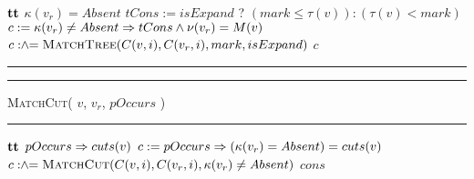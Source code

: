\begin{algorithm}[h!]
\begin{algorithmic}[1]
     \Return $\mathbf{tt}$ \EndIf
    \label{line:matchtree-vr-absent}
     \Return $\kappa(v_r) = Absent$ \EndIf
    \label{line:matchtree-v-absent}
    \State $tCons := isExpand$ \;? $( mark \leq \tau(v) ): ( \tau(v) < mark )$
    \State $c := \kappa(v_r) \neq Absent \Rightarrow tCons \land \nu(v_r)= M(v) $
    \label{line:matchtree-cons}
    \State\hspace{-2ex} $c \mathrel{:\hspace{-3pt}\land\hspace{-3pt}=} \textsc{MatchTree}( C(v,i), C(v_r,i), mark, isExpand)$
    \label{line:matchtree-recurse}
    \EndFor
    \State \Return $c$   
  \end{algorithmic}
  \hrule
  \vspace{3ex}
  \hrule\vspace{2pt}
  \textsc{MatchCut}( $v$, $v_r$, $pOccurs$ )\hfill\mbox{}
  \vspace{2pt}\hrule
  \begin{algorithmic}[1]
     \Return $\mathbf{tt}$ \EndIf
    \label{line:mcut-no-v}
     \Return $pOccurs \Rightarrow cuts(v)$ \EndIf
    \label{line:mcut-no-vr}
    \State $c := pOccurs \Rightarrow ( \kappa(v_r) = Absent) = cuts(v)$
    \label{line:mcut-cons}
    \State \hspace{-1.5ex}$c \mathrel{:\hspace{-3pt}\land\hspace{-3pt}=} \textsc{MatchCut}( C(v,i), C(v_r,i), \kappa(v_r) \neq Absent)$
    \label{line:mcut-kids}
    \EndFor
    \State \Return $cons$
  \end{algorithmic}      

\end{algorithm}


